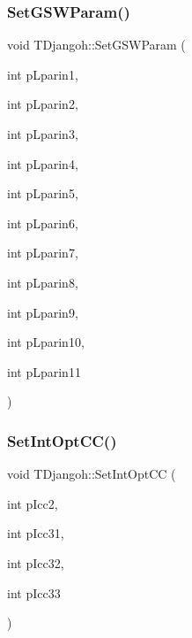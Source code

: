 \mbox{\label{class_t_djangoh_a87690d78d0b95de8851a5a801cc172e5}} 
\subsubsection{\texorpdfstring{Set\+G\+S\+W\+Param()}{SetGSWParam()}}
{\footnotesize\ttfamily void T\+Djangoh\+::\+Set\+G\+S\+W\+Param (\begin{DoxyParamCaption}\item[{int}]{p\+Lparin1,  }\item[{int}]{p\+Lparin2,  }\item[{int}]{p\+Lparin3,  }\item[{int}]{p\+Lparin4,  }\item[{int}]{p\+Lparin5,  }\item[{int}]{p\+Lparin6,  }\item[{int}]{p\+Lparin7,  }\item[{int}]{p\+Lparin8,  }\item[{int}]{p\+Lparin9,  }\item[{int}]{p\+Lparin10,  }\item[{int}]{p\+Lparin11 }\end{DoxyParamCaption})}

\mbox{\label{class_t_djangoh_adbec2d27a74ade279346a72d50b7e52a}} 
\subsubsection{\texorpdfstring{Set\+Int\+Opt\+C\+C()}{SetIntOptCC()}}
{\footnotesize\ttfamily void T\+Djangoh\+::\+Set\+Int\+Opt\+CC (\begin{DoxyParamCaption}\item[{int}]{p\+Icc2,  }\item[{int}]{p\+Icc31,  }\item[{int}]{p\+Icc32,  }\item[{int}]{p\+Icc33 }\end{DoxyParamCaption})}

\mbox{\label{class_t_djangoh_a0dbc06c203a2e4b29cf6fea815ee99b3}} 
